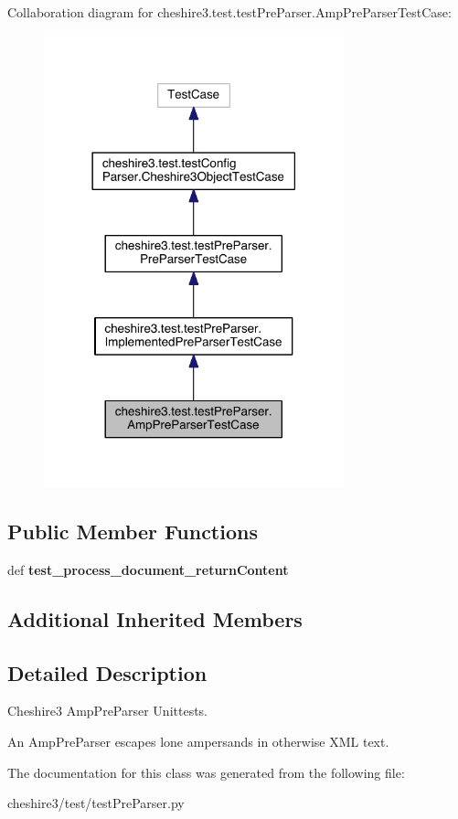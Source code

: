 Collaboration diagram for cheshire3.\-test.\-test\-Pre\-Parser.\-Amp\-Pre\-Parser\-Test\-Case\-:
\nopagebreak
\begin{figure}[H]
\begin{center}
\leavevmode
\includegraphics[width=246pt]{classcheshire3_1_1test_1_1test_pre_parser_1_1_amp_pre_parser_test_case__coll__graph}
\end{center}
\end{figure}
\subsection*{Public Member Functions}
\begin{DoxyCompactItemize}
\item 
\hypertarget{classcheshire3_1_1test_1_1test_pre_parser_1_1_amp_pre_parser_test_case_a8ab45ae845a787d1b4c8adf563e46849}{def {\bfseries test\-\_\-process\-\_\-document\-\_\-return\-Content}}\label{classcheshire3_1_1test_1_1test_pre_parser_1_1_amp_pre_parser_test_case_a8ab45ae845a787d1b4c8adf563e46849}

\end{DoxyCompactItemize}
\subsection*{Additional Inherited Members}


\subsection{Detailed Description}
\begin{DoxyVerb}Cheshire3 AmpPreParser Unittests.

An AmpPreParser escapes lone ampersands in otherwise XML text.
\end{DoxyVerb}
 

The documentation for this class was generated from the following file\-:\begin{DoxyCompactItemize}
\item 
cheshire3/test/test\-Pre\-Parser.\-py\end{DoxyCompactItemize}
